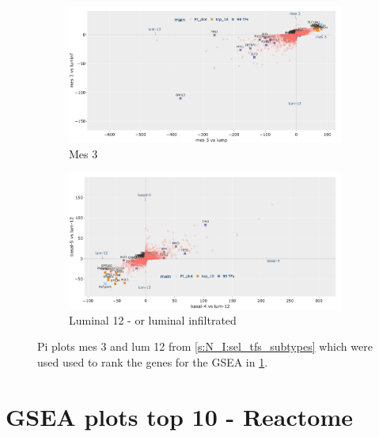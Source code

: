 \begin{figure}[!h]
    \centering
    \begin{subfigure}[!t]{1.0\textwidth}
        \includegraphics[width=\textwidth,keepaspectratio]{Sections/Network_I/Resources/selective_pruning/pi_gsea/pi_mesLike.png}
        \caption{Mes 3}
        \label{fig:ap:mes_like}
    \end{subfigure}
    \begin{subfigure}[!t]{1.0\textwidth}
        \includegraphics[width=\textwidth,keepaspectratio]{Sections/Network_I/Resources/selective_pruning/pi_gsea/pi_lumInf.png}
        \caption{Luminal 12 - or luminal infiltrated}
        \label{fig:ap:lumInf}
    \end{subfigure} 
    \caption{Pi plots mes 3 and lum 12 from \cref{s:N_I:sel_tfs_subtypes} which were used used to rank the genes for the GSEA in \cref{s:ap:sel_tfs_gsea_reactome}.}
    \label{fig:ap:pi_other_values_II}
\end{figure}

\newpage


\section{GSEA plots top 10 - Reactome} \label{s:ap:sel_tfs_gsea_reactome}

